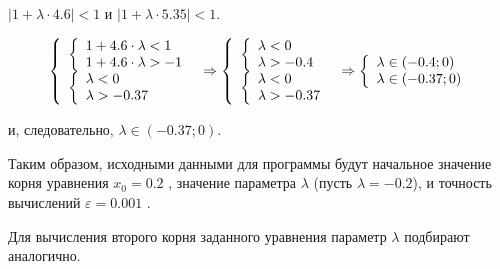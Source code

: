  $|1+\lambda\cdot 4.6|<1$  и  $|1+\lambda\cdot 5.35|<1$.

$$
\left\{\begin{array}{l}
\left\{\begin{array}{l}
1+4.6\cdot \lambda<1 \cr
1+4.6\cdot \lambda>-1
\end{array}\right.\cr
\left\{\begin{array}{l}
\lambda<0 \cr
\lambda>-0.37
\end{array}\right.
\end{array}\right.
\Rightarrow
\left\{\begin{array}{l}
\left\{\begin{array}{l}
\lambda<0 \cr
\lambda>-0.4
\end{array}\right.\cr
\left\{\begin{array}{l}
\lambda<0 \cr
\lambda>-0.37
\end{array}\right.
\end{array}\right.
\Rightarrow
\left\{\begin{array}{l}
\lambda\in (-0.4;0) \cr
\lambda\in (-0.37;0)
\end{array}\right.
$$

и, следовательно, 
$\lambda\in (-0.37;0)$.

Таким образом, исходными данными для программы будут начальное значение корня уравнения  $x_0=0.2$ , значение
параметра  $\lambda$ (пусть  $\lambda=-0.2$), и точность вычислений  $\varepsilon=0.001$ .

Для вычисления второго корня заданного уравнения параметр  $\lambda$  подбирают аналогично.

